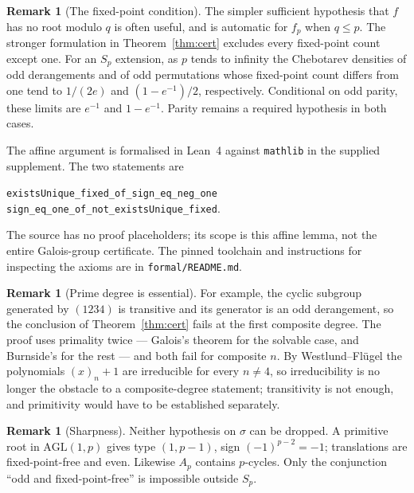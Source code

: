 \documentclass[11pt,a4paper]{amsart}
\newcommand{\AGL}{\mathrm{AGL}}
\theoremstyle{plain}
\theoremstyle{definition}
\newtheorem{remark}[theorem]{Remark}
\begin{document}
\begin{remark}[The fixed-point condition]
\label{rem:weaken}
The simpler sufficient hypothesis that \(f\) has no root modulo \(q\) is often useful, and is automatic for \(f_p\) when \(q\le p\). The stronger formulation in Theorem~\ref{thm:cert} excludes every fixed-point count except one. For an \(S_p\) extension, as \(p\) tends to infinity the Chebotarev densities of odd derangements and of odd permutations whose fixed-point count differs from one tend to \(1/(2e)\) and \((1-e^{-1})/2\), respectively. Conditional on odd parity, these limits are \(e^{-1}\) and \(1-e^{-1}\). Parity remains a required hypothesis in both cases.

The affine argument is formalised in Lean~4 against \texttt{mathlib} in the supplied supplement. The two statements are
\begin{center}
\texttt{existsUnique\_fixed\_of\_sign\_eq\_neg\_one}\\
\texttt{sign\_eq\_one\_of\_not\_existsUnique\_fixed}.
\end{center}
The source has no proof placeholders; its scope is this affine lemma, not the entire Galois-group certificate. The pinned toolchain and instructions for inspecting the axioms are in \texttt{formal/README.md}.
\end{remark}

\begin{remark}[Prime degree is essential]
\label{rem:composite}
For example, the cyclic subgroup generated by \((1234)\) is transitive and its generator is an odd derangement, so the conclusion of Theorem~\ref{thm:cert} fails at the first composite degree. The proof uses primality twice --- Galois's theorem for the solvable case, and Burnside's for the rest --- and both fail for composite \(n\). By Westlund--Fl\"ugel the polynomials \((x)_n+1\) are irreducible for every \(n\ne4\), so irreducibility is no longer the obstacle to a composite-degree statement; transitivity is not enough, and primitivity would have to be established separately.
\end{remark}

\begin{remark}[Sharpness]
Neither hypothesis on \(\sigma\) can be dropped. A primitive root in \(\AGL(1,p)\) gives type \((1,p-1)\), sign \((-1)^{p-2}=-1\); translations are fixed-point-free and even. Likewise \(A_p\) contains \(p\)-cycles. Only the conjunction ``odd and fixed-point-free'' is impossible outside \(S_p\).
\end{remark}
\end{document}
